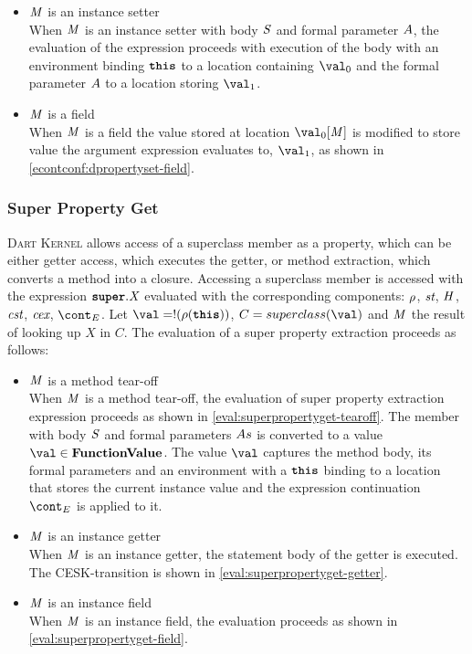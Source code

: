 \documentclass[a4paper,oneside,fleqn]{article}
\newcommand{\kernel}{\textsc{Dart Kernel}}
\newcommand{\synt}[1]{\ensuremath{\text{\textbf{\texttt{#1}}}}}
\newcommand{\this}{\synt{this}}
\newcommand{\dfunval}{\mathbf{FunctionValue}}
\newcommand{\idmeta}{\ensuremath{\mathit{X}}}
\begin{document}
\begin{itemize}
    \item $\mathit{M}$ is an instance setter\\
        When $\mathit{M}$ is an instance setter with body $\mathit{S}$ and formal parameter $A$, the evaluation of the expression proceeds with execution of the body with an environment binding $\this$ to a location containing $\val_0$ and the formal parameter $A$ to a location storing $\val_1$.

    \item $\mathit{M}$ is a field\\
        When $\mathit{M}$ is a field the value stored at location $\val_0[\membermeta]$ is modified to store value the argument expression evaluates to, $\val_1$, as shown in \eqref{econtconf:dpropertyset-field}.

\end{itemize}


\subsubsection{Super Property Get}
\label{subsubsec:super-property-get}

\kernel{} allows access of a superclass member as a property, which can be either getter access, which executes the getter, or method extraction, which converts a method into a closure.
Accessing a superclass member is accessed with the expression $\SuperPropertyGet{\idmeta}$ evaluated with the corresponding components: $\rho$, $\textit{st}$, $\mathit{H}$, $\textit{cst}$, $\textit{cex}$, $\econt$.
Let $\val = \deref{(\env(\this))}$, $C = \superclass{\val}$ and $\mathit{M}$ the result of looking up $\idmeta$ in $C$.
The evaluation of a super property extraction proceeds as follows:

\begin{itemize}
    \item $\mathit{M}$ is a method tear-off\\
        When $\mathit{M}$ is a method tear-off, the evaluation of super property extraction expression proceeds as shown in \eqref{eval:superpropertyget-tearoff}.
        The member with body $\mathit{S}$ and formal parameters $As$ is converted to a value $\val \in \dfunval$.
        The value $\val$ captures the method body, its formal parameters and an environment with a $\this$ binding to a location that stores the current instance value and the expression continuation $\econt$ is applied to it.

    \item $\mathit{M}$ is an instance getter\\
        When $\mathit{M}$ is an instance getter, the statement body of the getter is executed.
        The CESK-transition is shown in \eqref{eval:superpropertyget-getter}.

    \item $\mathit{M}$ is an instance field\\
        When $\mathit{M}$ is an instance field, the evaluation proceeds as shown in \eqref{eval:superpropertyget-field}.

\end{itemize}
\end{document}
